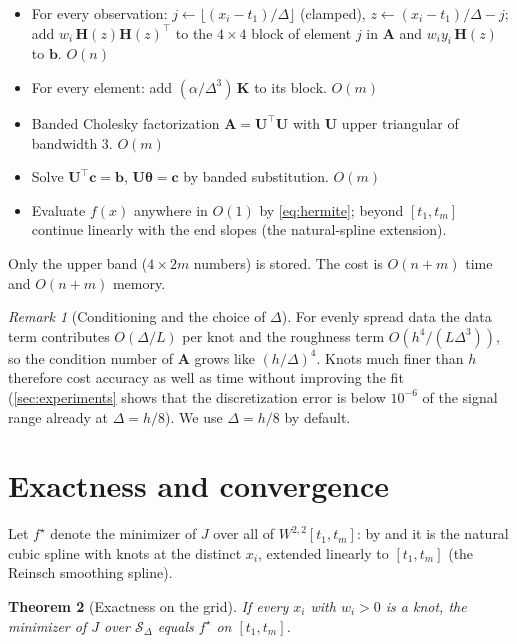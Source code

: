 \documentclass[11pt,a4paper]{article}
\newtheorem{theorem}{Theorem}
\theoremstyle{definition}
\theoremstyle{remark}
\newtheorem{remark}[theorem]{Remark}
\newcommand{\vth}{\boldsymbol{\theta}}
\newcommand{\vb}{\mathbf{b}}
\newcommand{\mA}{\mathbf{A}}
\newcommand{\mK}{\mathbf{K}}
\newcommand{\mU}{\mathbf{U}}
\newcommand{\Sd}{\mathcal{S}_\Delta}
\begin{document}
\begin{tcolorbox}[colback=gray!4,colframe=gray!50,title=Algorithm 1: fitting in $O(n+m)$,fonttitle=\bfseries]
\begin{itemize}[leftmargin=*,itemsep=2pt]
\item For every observation: $j\gets\lfloor(x_i-t_1)/\Delta\rfloor$ (clamped), $z\gets (x_i-t_1)/\Delta-j$; add $w_i\,\mathbf H(z)\mathbf H(z)^\top$ to the $4\times 4$ block of element $j$ in $\mA$ and $w_iy_i\,\mathbf H(z)$ to $\vb$. \hfill $O(n)$
\item For every element: add $(\alpha/\Delta^3)\,\mK$ to its block. \hfill $O(m)$
\item Banded Cholesky factorization $\mA=\mU^\top\mU$ with $\mU$ upper triangular of bandwidth $3$. \hfill $O(m)$
\item Solve $\mU^\top\mathbf c=\vb$, $\mU\vth=\mathbf c$ by banded substitution. \hfill $O(m)$
\item Evaluate $f(x)$ anywhere in $O(1)$ by \eqref{eq:hermite}; beyond $[t_1,t_m]$ continue linearly with the end slopes (the natural-spline extension).
\end{itemize}
Only the upper band ($4\times 2m$ numbers) is stored. The cost is $O(n+m)$ time and $O(n+m)$ memory.
\end{tcolorbox}

\begin{remark}[Conditioning and the choice of $\Delta$]
\label{rem:conditioning}
For evenly spread data the data term contributes $O(\Delta/L)$ per knot and the roughness term $O(h^4/(L\Delta^3))$, so the condition number of $\mA$ grows like $(h/\Delta)^4$. Knots much finer than $h$ therefore cost accuracy as well as time without improving the fit (\cref{sec:experiments} shows that the discretization error is below $10^{-6}$ of the signal range already at $\Delta=h/8$). We use $\Delta=h/8$ by default.
\end{remark}

\section{Exactness and convergence}
\label{sec:exactness}

Let $f^\star$ denote the minimizer of $J$ over all of $W^{2,2}[t_1,t_m]$: by \citet{Schoenberg1964} and \citet{Reinsch1967} it is the natural cubic spline with knots at the distinct $x_i$, extended linearly to $[t_1,t_m]$ (the Reinsch smoothing spline).

\begin{theorem}[Exactness on the grid]
\label{thm:exact}
If every $x_i$ with $w_i>0$ is a knot, the minimizer of $J$ over $\Sd$ equals $f^\star$ on $[t_1,t_m]$.
\end{theorem}
\end{document}
